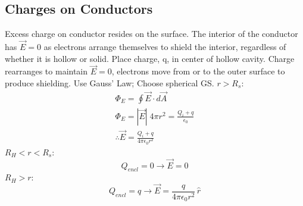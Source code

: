 \documentclass[a4paper, 11pt, normalem]{report}
\begin{document}
\section{Charges on Conductors}
Excess charge on conductor resides on the surface. 
The interior of the conductor has $\vec{E} = 0$ as electrons arrange themselves to shield the interior, regardless of whether it is hollow or solid.
Place charge, q, in center of hollow cavity. 
Charge rearranges to maintain $\vec{E} = 0$, electrons move from or to the outer surface to produce shielding. 
Use Gauss' Law; Choose spherical GS.
$r > R_{s}$:
\begin{align}
    \Phi_{E} = \oint \vec{E} \cdot d\vec{A} \\
    \Phi_{E} = |\vec{E}| \; 4\pi r^{2}= \frac{Q_{i} + q}{\epsilon_{0}} \\
    \therefore \vec{E} = \frac{Q_{i} + q}{4\pi \epsilon_{0} r^{2} }
\end{align}
$R_{H} < r < R_{s}$:
\begin{equation}
    Q_{encl} = 0 \to \vec{E} = 0
\end{equation}
$R_{H} > r$:
\begin{equation}
    Q_{encl} = q \to \vec{E} = \frac{q}{4\pi \epsilon_{0} r^{2}} \, \hat{r}
\end{equation}

\chapter{}
\end{document}
